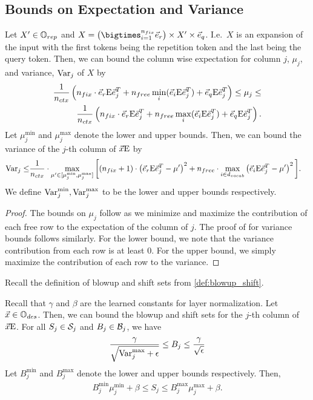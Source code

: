 \subsection*{Bounds on Expectation and Variance}
\begin{lemma}
	\label{lem:bounds}
	Let $X' \in \mathbb{O}_{rep}$ and $X = \left(\bigtimes_{i = 1}^{\ndes} \vecDes \right) \times X' \times \vecQuery$. I.e.\ $X$ is an expansion of the input with the first tokens being the repetition token and the last being the query token.
	Then, we can bound the column wise expectation for column $j$, $\mu_j$, and variance, $\mathrm{Var}_j$ of $X$ by
	\begin{align*}
		\frac{1}{{n_{ctx}}}\left(
			n_{fix} \cdot \vec{e}_{r} \text{E} \vec{e}_j^T + n_{free} \min_i (\vec{e}_i \text{E} \vec{e}_j^T) + \vec{e}_q \text{E} \vec{e}_j^T
		\right)
		\leq \mu_j \leq  \\
		\frac{1}{{n_{ctx}}}\left(
			n_{fix} \cdot \vec{e}_{r} \text{E} \vec{e}_j^T + n_{free} \max_i (\vec{e}_i \text{E} \vec{e}_j^T) + \vec{e}_q \text{E} \vec{e}_j^T
		\right).
	\end{align*}
	Let $\mu_j^{\min}$ and $\mu_j^{\max}$ denote the lower and upper bounds.
	Then, we can bound the variance of the $j$-th column of $\vec{x} \text{E}$ by
	\begin{align*}
            \mathrm{Var}_j 
			\leq &\frac{1}{{n_{ctx}}} \cdot \max_{\mu' \in [\mu_j^{\min}, \mu_j^{\max}]} \bigg[
			 (n_{fix} +1) \cdot  \left( \vec{e}_{r} \text{E} \vec{e}_j^T -  \mu' \right)^2 + 
			 n_{free} \cdot \max_{i \in {d_{vocab}}} \left( \vec{e}_i \text{E} \vec{e}_j^T -  \mu' \right)^2
			\bigg].
	\end{align*}
	We define $\mathrm{Var}_j^{\min}, \mathrm{Var}_j^{\max}$ to be the lower and upper bounds respectively.
\end{lemma}
\begin{proof}
	The bounds on $\mu_j$ follow as we minimize and maximize the contribution of each free row to the expectation of the column of $j$.
	The proof of for variance bounds follows similarly.
	For the lower bound, we note that the variance contribution from each row is at least $0$.
	For the upper bound, we simply maximize the contribution of each row to the variance. 
\end{proof}

Recall the definition of blowup and shift sets from \cref{def:blowup_shift}.
\begin{lemma}
	\label{lem:blowup_shift}
	Recall that $\gamma$ and $\beta$ are the learned constants for layer normalization.
	Let $\vec{x} \in \mathbb{O}_{des}$.
	Then, we can bound the blowup and shift sets for the $j$-th column of $\vec{x} \text{E}$.
	For all $S_j \in \mathcal{S}_j$ and $B_j \in \mathcal{B}_j$, we have
	\begin{align*}
		\frac{\gamma}{\sqrt{\mathrm{Var}_j^{\max} + \epsilon}} \leq B_j \leq \frac{\gamma}{\sqrt{\epsilon}}
	\end{align*}
	Let $B_j^{\min}$ and $B_j^{\max}$ denote the lower and upper bounds respectively.
	Then,
	\begin{align*}
		B_j^{\min} \mu_j^{\min} + \beta \leq S_j \leq B_j^{\max} \mu_j^{\max} + \beta.
	\end{align*}
\end{lemma}

